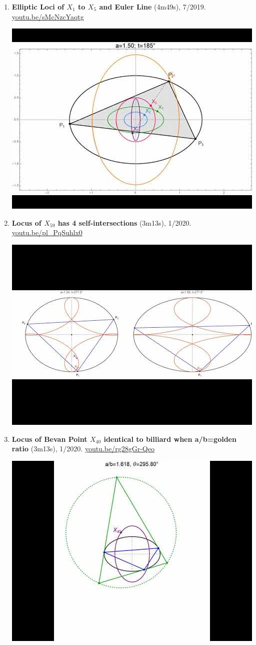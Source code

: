 \documentclass[12pt]{article}
\begin{document}
\begin{enumerate}[resume]
% 
\item \textbf{Elliptic Loci of $X_{1}$ to $X_{5}$ and Euler Line} (4m49s), 7/2019. \href{https://youtu.be/sMcNzcYaqtg}{\url{youtu.be/sMcNzcYaqtg}}
\begin{center}\includegraphics[width=.5\textwidth]{pics/sMcNzcYaqtg.jpg}\end{center}
% 
\item \textbf{Locus of $X_{59}$ has 4 self-intersections} (3m13s), 1/2020. \href{https://youtu.be/pl_PqSuhlx0}{\url{youtu.be/pl\_PqSuhlx0}}
\begin{center}\includegraphics[width=.5\textwidth]{pics/pl_PqSuhlx0.jpg}\end{center}
% 
\item \textbf{Locus of Bevan Point $X_{40}$ identical to billiard when a/b=golden ratio} (3m13s), 1/2020. \href{https://youtu.be/rg28gGr-Qeo}{\url{youtu.be/rg28gGr-Qeo}}
\begin{center}\includegraphics[width=.5\textwidth]{pics/rg28gGr-Qeo.jpg}\end{center}

\end{enumerate}
\end{document}
